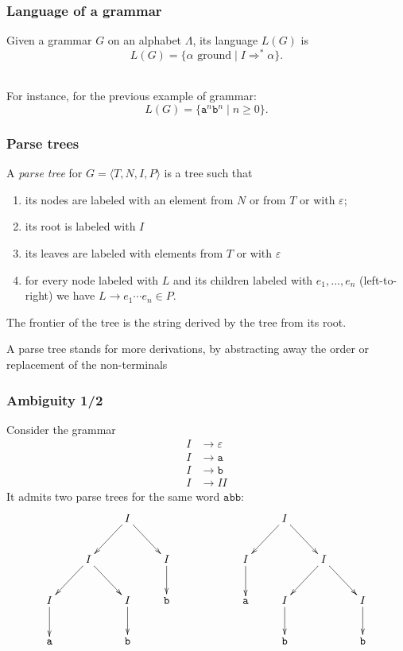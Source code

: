 \documentclass[11pt]{beamer}  %
\begin{document}
\begin{frame}\frametitle{Language of a grammar}

\begin{greenbox}{}
Given a grammar $G$ on an alphabet $\Lambda$,
its language $L(G)$ is
\[
  L(G)=\{\alpha\text{ ground}\mid I\Rightarrow^*\alpha\}.
\]
\end{greenbox}

\mbox{}\\

For instance, for the previous example of grammar:
%
\[
  L(G)=\{\mathtt{a}^n\mathtt{b}^n\mid n\ge 0\}.
\]

\end{frame}

\begin{frame}\frametitle{Parse trees}

\begin{greenbox}{}
A \emph{parse tree} for $G=\langle T,N,I,P\rangle$ is a tree such that
%
\begin{enumerate}
\item its nodes are labeled with an element from $N$ or from $T$ or with
      $\varepsilon$;
\item its root is labeled with $I$
\item its leaves are labeled with elements from $T$ or with $\varepsilon$
\item for every node labeled with $L$ and its children labeled with
      $e_1,\ldots,e_n$ (left-to-right) we have $L\to e_1\cdots e_n\in P$.
\end{enumerate}
%
The frontier of the tree is the string derived by the tree from its root.
\end{greenbox}

\begin{center}
A parse tree stands for more derivations, by abstracting away the order or replacement of
the non-terminals
\end{center}

\end{frame}

\begin{frame}\frametitle{Ambiguity 1/2}

Consider the grammar
%
\[
\begin{split}
  I&\to\varepsilon\\
  I&\to\mathtt{a}\\
  I&\to\mathtt{b}\\
  I&\to II
\end{split}
\]
%
It admits two parse trees for the same word $\mathtt{abb}$:
%
\[
\xymatrix{
   &   & I\ar[ld]\ar[rd] \\
   & I\ar[ld]\ar[rd] &   & I\ar[d]\\
 I\ar[d] &   & I\ar[d] & \mathtt{b}\\
 \mathtt{a} & & \mathtt{b}
}
\qquad\qquad\qquad
\xymatrix{
  & I\ar[ld]\ar[rd] \\
I\ar[d] &   & I\ar[ld]\ar[rd]\\
\mathtt{a} & I\ar[d] &  & I\ar[d]\\
  & \mathtt{b} &  & \mathtt{b}
}
\]

\end{frame}
\end{document}
